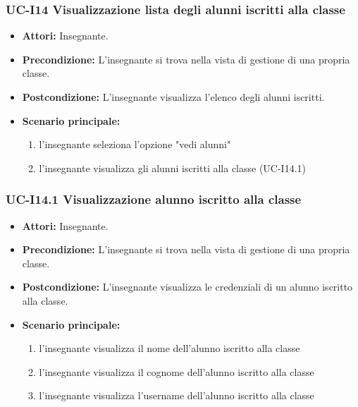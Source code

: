 \subsubsection{UC-I14 Visualizzazione lista degli alunni iscritti alla classe}		
\begin{itemize}
	\item \textbf{Attori:} Insegnante.
	\item \textbf{Precondizione:} L'insegnante si trova nella vista di gestione di una propria classe.
	\item \textbf{Postcondizione:} L'insegnante visualizza l'elenco degli alunni iscritti.
	\item \textbf{Scenario principale:}
	\begin{enumerate}
		\item l'insegnante seleziona l'opzione "vedi alunni"
		\item l'insegnante visualizza gli alunni iscritti alla classe (UC-I14.1)
			\end{enumerate}		
\end{itemize}

\subsubsection{UC-I14.1 Visualizzazione alunno iscritto alla classe}		
\begin{itemize}
	\item \textbf{Attori:} Insegnante.
	\item \textbf{Precondizione:} L'insegnante si trova nella vista di gestione di una propria classe.
	\item \textbf{Postcondizione:} L'insegnante visualizza le credenziali di un alunno iscritto alla classe.
	\item \textbf{Scenario principale:}
	\begin{enumerate}
		\item l'insegnante visualizza il nome dell'alunno iscritto alla classe
		\item l'insegnante visualizza il cognome dell'alunno iscritto alla classe
		\item l'insegnante visualizza l'username dell'alunno iscritto alla classe
			\end{enumerate}		
\end{itemize}

